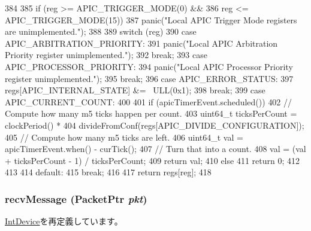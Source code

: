 \begin{DoxyCode}
384 {
385     if (reg >= APIC_TRIGGER_MODE(0) &&
386             reg <= APIC_TRIGGER_MODE(15)) {
387         panic("Local APIC Trigger Mode registers are unimplemented.\n");
388     }
389     switch (reg) {
390       case APIC_ARBITRATION_PRIORITY:
391         panic("Local APIC Arbitration Priority register unimplemented.\n");
392         break;
393       case APIC_PROCESSOR_PRIORITY:
394         panic("Local APIC Processor Priority register unimplemented.\n");
395         break;
396       case APIC_ERROR_STATUS:
397         regs[APIC_INTERNAL_STATE] &= ~ULL(0x1);
398         break;
399       case APIC_CURRENT_COUNT:
400         {
401             if (apicTimerEvent.scheduled()) {
402                 // Compute how many m5 ticks happen per count.
403                 uint64_t ticksPerCount = clockPeriod() *
404                     divideFromConf(regs[APIC_DIVIDE_CONFIGURATION]);
405                 // Compute how many m5 ticks are left.
406                 uint64_t val = apicTimerEvent.when() - curTick();
407                 // Turn that into a count.
408                 val = (val + ticksPerCount - 1) / ticksPerCount;
409                 return val;
410             } else {
411                 return 0;
412             }
413         }
414       default:
415         break;
416     }
417     return regs[reg];
418 }
\end{DoxyCode}
\hypertarget{classX86ISA_1_1Interrupts_a3dad3b561a1022eee5fab74df92ce766}{
\subsubsection[{recvMessage}]{ recvMessage ({\bf PacketPtr} {\em pkt})}}
\label{classX86ISA_1_1Interrupts_a3dad3b561a1022eee5fab74df92ce766}


\hyperlink{classX86ISA_1_1IntDevice_a6da97a03af9e80f6f8b865b85a430f35}{IntDevice}を再定義しています。


